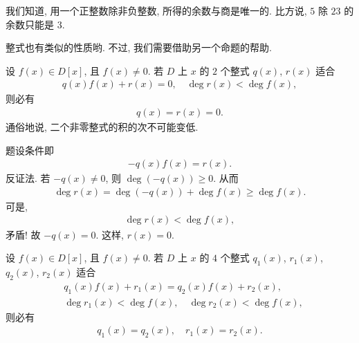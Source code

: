 我们知道, 用一个正整数除非负整数, 所得的余数与商是唯一的. 比方说, $5$ 除 $23$ 的余数只能是 $3$.

整式也有类似的性质哟. 不过, 我们需要借助另一个命题的帮助.

\begin{proposition}
    设 $f(x) \in D[x]$, 且 $f(x) \neq 0$. 若 $D$ 上 $x$ 的 $2$ 个整式 $q(x)$, $r(x)$ 适合
    \begin{align*}
        q(x) f(x) + r(x) = 0, \quad \deg r(x) < \deg f(x),
    \end{align*}
    则必有
    \begin{align*}
        q(x) = r(x) = 0.
    \end{align*}
    通俗地说, 二个非零整式的积的次不可能变低.
\end{proposition}

\begin{pf}
    题设条件即
    \begin{align*}
        -q(x) f(x) = r(x).
    \end{align*}
    反证法. 若 $-q(x) \neq 0$, 则 $\deg (-q(x)) \geq 0$. 从而
    \begin{align*}
        \deg r(x) = \deg (-q(x)) + \deg f(x) \geq \deg f(x).
    \end{align*}
    可是,
    \begin{align*}
        \deg r(x) < \deg f(x),
    \end{align*}
    矛盾! 故 $-q(x) = 0$. 这样, $r(x) = 0$.
\end{pf}

\begin{proposition}
    设 $f(x) \in D[x]$, 且 $f(x) \neq 0$. 若 $D$ 上 $x$ 的 $4$ 个整式 $q_1 (x)$, $r_1 (x)$, $q_2 (x)$, $r_2 (x)$ 适合
    \begin{align*}
         & q_1 (x) f(x) + r_1 (x) = q_2 (x) f(x) + r_2 (x),          \\
         & \deg r_1 (x) < \deg f(x), \quad \deg r_2 (x) < \deg f(x),
    \end{align*}
    则必有
    \begin{align*}
        q_1 (x) = q_2 (x), \quad r_1 (x) = r_2 (x).
    \end{align*}
\end{proposition}

